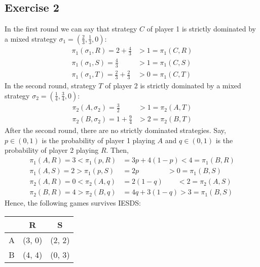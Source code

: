\documentclass[]{article}
\begin{document}
\subsection*{Exercise 2}
In the first round we can say that strategy $C$ of player 1 is strictly dominated by a mixed strategy $\sigma_1 = (\frac{2}{3}, \frac{1}{3}, 0)$:
\begin{equation}
	\begin{split}
		\pi_1(\sigma_1, R) = 2 + \frac{4}{3}& > 1 = \pi_1(C, R) \\ \nonumber
		\pi_1(\sigma_1, S) = \frac{4}{3}& > 1 = \pi_1(C, S) \\
		\pi_1(\sigma_1, T) = \frac{2}{3} + \frac{2}{3}& > 0 = \pi_1(C, T)
	\end{split}
\end{equation}
In the second round, strategy $T$ of player 2 is strictly dominated by a mixed strategy $\sigma_2 = (\frac{1}{4}, \frac{3}{4}, 0)$:
\begin{equation}
	\begin{split}
		\pi_2(A, \sigma_2) = \frac{3}{2}& > 1 = \pi_2(A, T) \\ \nonumber
		\pi_2(B, \sigma_2) = 1 + \frac{9}{4}& > 2 = \pi_2(B, T)
	\end{split}
\end{equation}
After the second round, there are no strictly dominated strategies. Say, $p\in(0, 1)$ is the probability of player 1 playing $A$ and $q\in(0, 1)$ is the probability of player 2 playing $R$. Then,
\begin{equation}
	\begin{split}
		\pi_1(A, R) = 3 < \pi_1(p, R) &= 3p + 4(1-p) < 4 = \pi_1(B, R) \\ \nonumber
		\pi_1(A, S) = 2 > \pi_1(p, S) &= 2p \qquad\qquad > 0 = \pi_1(B, S) \\
		\pi_2(A, R) = 0 < \pi_2(A, q) &= 2(1-q) \qquad < 2 = \pi_2(A, S) \\
		\pi_2(B, R) = 4 > \pi_2(B, q) &= 4q + 3(1-q) > 3 = \pi_1(B, S)
	\end{split}
\end{equation}
Hence, the following games survives IESDS:
	\begin{table}[h]
	\centering
	\begin{tabular}{c|c|c}
			& R 		& S \\
		\hline
		A 	& (3, 0) 	& (2, 2) \\
		B 	& (4, 4) 	& (0, 3)
	\end{tabular}
\end{table}
\end{document}
